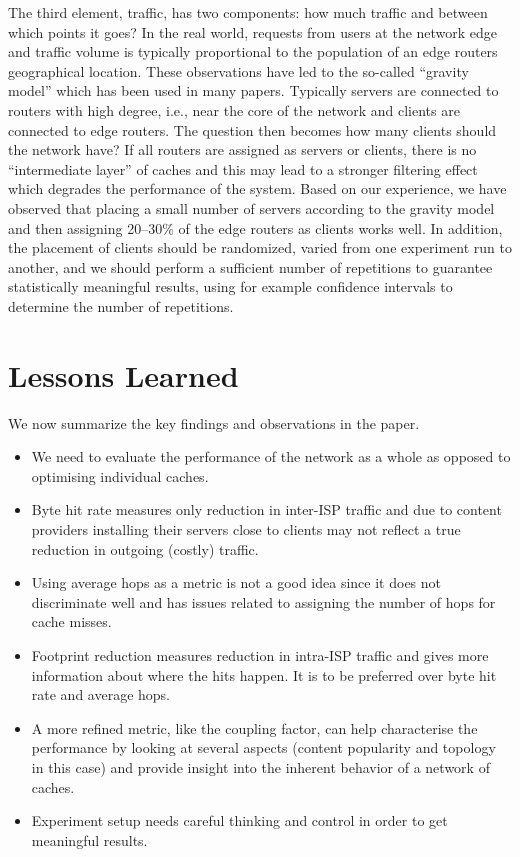 \documentclass{sigcomm-alternate}
\begin{document}
The third element, traffic, has two components: how much traffic and between which points it goes?
In the real world, requests from users at the network edge and traffic volume is typically proportional to the population of an edge routers geographical location.
These observations have led to the so-called ``gravity model'' which has been used in many papers.
Typically servers are connected to routers with high degree, i.e., near the core of the network and clients are connected to edge routers.
The question then becomes how many clients should the network have?
If all routers are assigned as servers or clients, there is no ``intermediate layer'' of caches and this may lead to a stronger filtering effect which degrades the performance of the system.
Based on our experience, we have observed that placing a small number of servers according to the gravity model and then assigning 20--30\% of the edge routers as clients works well.
In addition, the placement of clients should be randomized, varied from one experiment run to another, and we should perform a sufficient number of repetitions to guarantee statistically meaningful results, using for example confidence intervals to determine the number of repetitions.





\section{Lessons Learned}
\label{sec:lessons-learned}

We now summarize the key findings and observations in the paper.

\begin{itemize}
\item We need to evaluate the performance of the network as a whole as opposed to optimising individual caches.
\item Byte hit rate measures only reduction in inter-ISP traffic and due to content providers installing their servers close to clients may not reflect a true reduction in outgoing (costly) traffic.
\item Using average hops as a metric is not a good idea since it does not discriminate well and has issues related to assigning the number of hops for cache misses.
\item Footprint reduction measures reduction in intra-ISP traffic and gives more information about where the hits happen.
  It is to be preferred over byte hit rate and average hops.
\item A more refined metric, like the coupling factor, can help characterise the performance by looking at several aspects (content popularity and topology in this case) and provide insight into the inherent behavior of a network of caches.
\item Experiment setup needs careful thinking and control in order to get meaningful results.
\end{itemize}
\end{document}
